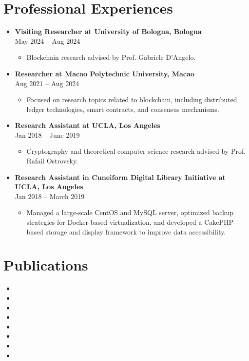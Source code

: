 \documentclass[a4paper,12pt]{article}
\begin{document}
\section*{Professional Experiences}
\begin{itemize}[left=0pt, label={}, noitemsep]
    \item \textbf{Visiting Researcher at University of Bologna, Bologna} \\
    May 2024 – Aug 2024 
    \begin{itemize}[left=0pt,label=\textbullet,topsep=0pt]
        \item Blockchain research advised by Prof. Gabriele D'Angelo.
    \end{itemize}
    \item \textbf{Researcher at Macao Polytechnic University, Macao} \\
    Aug 2021 – Aug 2024
    \begin{itemize}[left=0pt,label=\textbullet,topsep=0pt]
        \item Focused on research topics related to blockchain, including distributed ledger technologies, smart contracts, and consensus mechanisms. 
    \end{itemize}
    \item \textbf{Research Assistant at UCLA, Los Angeles} \\
    Jan 2018 – June 2019
    \begin{itemize}[left=0pt,label=\textbullet,topsep=0pt]
    \item Cryptography and theoretical computer science research advised by Prof. Rafail Ostrovsky.
    \end{itemize}
    \item \textbf{Research Assistant in Cuneiform Digital Library Initiative at UCLA, Los Angeles} \\
    Jan 2018 – March 2019
    \begin{itemize}[left=0pt,label=\textbullet,topsep=0pt]
        \item Managed a large-scale CentOS and MySQL server, optimized backup strategies for Docker-based virtualization, and developed a CakePHP-based storage and display framework to improve data accessibility.
    \end{itemize}
\end{itemize}

\section*{Publications}
\begin{itemize}[left=0pt]
    \item {}
    \item {}
    \item {}
    \item {}
    \item {}
    \item {}
    \item {}
    \item {}
\end{itemize}
\end{document}
